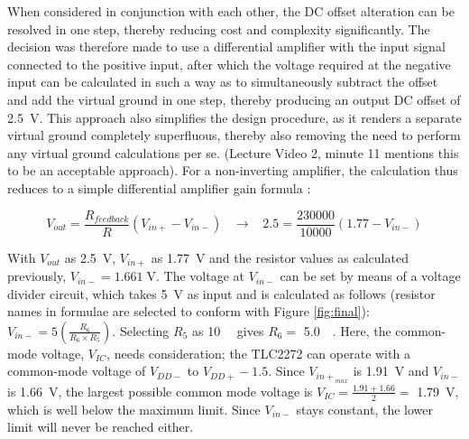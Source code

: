 When considered in conjunction with each other, the DC offset alteration can be resolved in one step, thereby reducing cost and complexity significantly. The decision was therefore made to use a differential amplifier with the input signal connected to the positive input, after which the voltage required at the negative input can be calculated in such a way as to simultaneously subtract the offset and add the virtual ground in one step, thereby producing an output DC offset of \SI{2.5}{\volt}.  This approach also simplifies the design procedure, as it renders a separate virtual ground completely superfluous, thereby also removing the need to perform any virtual ground calculations per se.  (Lecture Video 2, minute 11\cite{vground} mentions this to be an acceptable approach). For a non-inverting amplifier, the calculation thus reduces to a simple differential amplifier gain formula \cite{opamp}: 

$$V_{out}=\frac{{R}_{feedback}}{{R}}\left({V}_{in+}-{V}_{in-}\right) \;\;\; \rightarrow \;\;\; 2.5=\frac{230000}{10000}\left(1.77-{V}_{in-}\right)$$

With $V_{out}$ as \SI{2.5}{\volt}, $V_{in+}$ as \SI{1.77}{\volt} and the resistor values as calculated previously, ${V}_{in-} = 1.661 \; \mathrm{V}$. The voltage at ${V}_{in-}$ can be set by means of a voltage divider circuit, which takes \SI{5}{\volt} as input and is calculated as follows (resistor names in formulae are selected to conform with Figure \ref{fig:final}): ${V}_{in-} = 5 (\frac{R_{6}}{R_{6}\times R_{5}})$. Selecting $R_5$ as \SI{10}{\kilo \Omega} gives $R_6 =$ \SI{5.0}{\kilo \Omega}. Here, the common-mode voltage, $V_{IC}$, needs consideration; the TLC2272 can operate with a common-mode voltage of $V_{DD-}$ to $V_{DD+} - 1.5$\cite{tlc2272}. Since $V_{{in+}_{max}}$ is \SI{1.91}{\volt} and $V_{in-}$ is \SI{1.66}{\volt}, the largest possible common mode voltage is $V_{IC} = \frac{1.91 + 1.66}{2} =$ \SI{1.79}{\volt}, which is well below the maximum limit. Since $V_{in-}$ stays constant, the lower limit will never be reached either.\\

